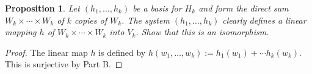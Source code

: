 \documentclass{article}
\newtheorem{prop}{Proposition}[section]
\begin{document}
\begin{prop} Let $(h_1, \dots, h_k)$ be a basis for $H_k$ and form the direct sum $W_k \times \cdots \times W_k$ of $k$ copies of $W_k$. The system $(h_1, \dots, h_k)$ clearly defines a linear mapping $h$ of $W_k \times \cdots \times W_k$ into $V_k$. Show that this is an isomorphism.
\end{prop}
\begin{proof}
    The linear map $h$ is defined by $h(w_1, \dots, w_k) := h_1(w_1) + \cdots h_k(w_k)$. This is surjective by Part B.
\end{proof}
\end{document}

